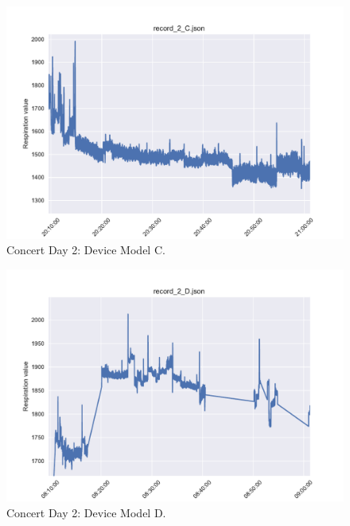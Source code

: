 \begin{figure}
    \centering
    \includegraphics[scale=0.6]{images/record_2_c.pdf}
    \caption{Concert Day 2: Device Model C.}
    \label{fig:concert_day2_c}
\end{figure}

\begin{figure}
    \centering
    \includegraphics[scale=0.6]{images/record_2_d.pdf}
    \caption{Concert Day 2: Device Model D.}
    \label{fig:concert_day2_d}
\end{figure}


